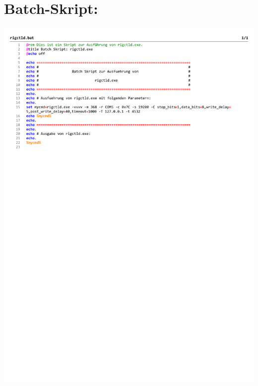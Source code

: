 
\appendix

\chapter{Batch-Skript: }
\label{chap:rigctldbat}

\begin{center}
	\includegraphics[width=1\textwidth]{./appendicies/rigctld}
\end{center}

